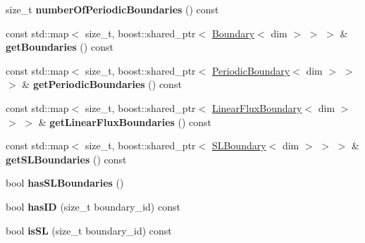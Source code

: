 \begin{DoxyCompactItemize}
\item 
\hypertarget{classnatrium_1_1BoundaryCollection_a62004be7508761795d894ed7ca7e4eb8}{
size\_\-t {\bfseries numberOfPeriodicBoundaries} () const }
\label{classnatrium_1_1BoundaryCollection_a62004be7508761795d894ed7ca7e4eb8}

\item 
\hypertarget{classnatrium_1_1BoundaryCollection_a3c7a2ed26b19c2650c91e89052f94025}{
const std::map$<$ size\_\-t, boost::shared\_\-ptr$<$ \hyperlink{classnatrium_1_1Boundary}{Boundary}$<$ dim $>$ $>$ $>$ \& {\bfseries getBoundaries} () const }
\label{classnatrium_1_1BoundaryCollection_a3c7a2ed26b19c2650c91e89052f94025}

\item 
\hypertarget{classnatrium_1_1BoundaryCollection_a280f2769a647610ee330205e8038239c}{
const std::map$<$ size\_\-t, boost::shared\_\-ptr$<$ \hyperlink{classnatrium_1_1PeriodicBoundary}{PeriodicBoundary}$<$ dim $>$ $>$ $>$ \& {\bfseries getPeriodicBoundaries} () const }
\label{classnatrium_1_1BoundaryCollection_a280f2769a647610ee330205e8038239c}

\item 
\hypertarget{classnatrium_1_1BoundaryCollection_a3b04ece6b8b942c2189493eea93fe9b4}{
const std::map$<$ size\_\-t, boost::shared\_\-ptr$<$ \hyperlink{classnatrium_1_1LinearFluxBoundary}{LinearFluxBoundary}$<$ dim $>$ $>$ $>$ \& {\bfseries getLinearFluxBoundaries} () const }
\label{classnatrium_1_1BoundaryCollection_a3b04ece6b8b942c2189493eea93fe9b4}

\item 
\hypertarget{classnatrium_1_1BoundaryCollection_a980dcbe94f1c80e0a73de722724a00e7}{
const std::map$<$ size\_\-t, boost::shared\_\-ptr$<$ \hyperlink{classnatrium_1_1SLBoundary}{SLBoundary}$<$ dim $>$ $>$ $>$ \& {\bfseries getSLBoundaries} () const }
\label{classnatrium_1_1BoundaryCollection_a980dcbe94f1c80e0a73de722724a00e7}

\item 
\hypertarget{classnatrium_1_1BoundaryCollection_a3773550ad0da7ee09a1870a5e2f45c9e}{
bool {\bfseries hasSLBoundaries} ()}
\label{classnatrium_1_1BoundaryCollection_a3773550ad0da7ee09a1870a5e2f45c9e}

\item 
\hypertarget{classnatrium_1_1BoundaryCollection_ad0c126620e40bc08b5aa959d774f98e2}{
bool {\bfseries hasID} (size\_\-t boundary\_\-id) const }
\label{classnatrium_1_1BoundaryCollection_ad0c126620e40bc08b5aa959d774f98e2}

\item 
\hypertarget{classnatrium_1_1BoundaryCollection_a343dd25dde692d73e1d3826f6d297856}{
bool {\bfseries isSL} (size\_\-t boundary\_\-id) const }
\label{classnatrium_1_1BoundaryCollection_a343dd25dde692d73e1d3826f6d297856}

\end{DoxyCompactItemize}


